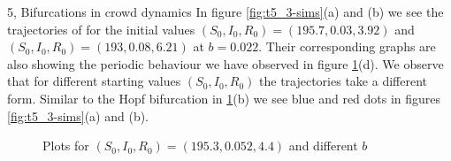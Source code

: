 \begin{task}{5, Bifurcations in crowd dynamics}
In figure \ref{fig:t5_3-sims}(a) and (b) we see the trajectories of for the initial values $(S_0, I_0, R_0 )=(195.7, 0.03, 3.92)$ and $(S_0, I_0, R_0 )=(193, 0.08, 6.21)$ at $b=0.022$. Their corresponding graphs are also showing the periodic behaviour we have observed in figure \ref{fig:t5_3-trajB}(d). We observe that for different starting values  $(S_0, I_0, R_0 )$ the trajectories take a different form. Similar to the Hopf bifurcation in \ref{fig:t5_3-trajB}(b) we see blue and red dots in figures \ref{fig:t5_3-sims}(a) and (b).

\begin{figure}[H]
\centering
{}
\caption{Plots for $(S_0, I_0, R_0 )=(195.3,0.052,4.4)$ and different $b$}
\label{fig:t5_3-trajB}
\end{figure}


\end{task}
